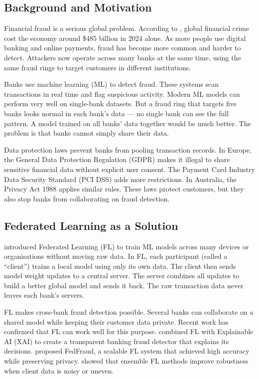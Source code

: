 \documentclass[12pt, a4paper]{article}
\begin{document}
\subsection{Background and Motivation}

Financial fraud is a serious global problem. According to \citet{nasdaq2024}, global financial crime cost the economy around \$485 billion in 2024 alone. As more people use digital banking and online payments, fraud has become more common and harder to detect. Attackers now operate across many banks at the same time, using the same fraud rings to target customers in different institutions.

Banks use machine learning (ML) to detect fraud. These systems scan transactions in real time and flag suspicious activity. Modern ML models can perform very well on single-bank datasets. But a fraud ring that targets five banks looks normal in each bank's data --- no single bank can see the full pattern. A model trained on all banks' data together would be much better. The problem is that banks cannot simply share their data.

Data protection laws prevent banks from pooling transaction records. In Europe, the General Data Protection Regulation (GDPR) makes it illegal to share sensitive financial data without explicit user consent. The Payment Card Industry Data Security Standard (PCI DSS) adds more restrictions. In Australia, the Privacy Act 1988 applies similar rules. These laws protect customers, but they also stop banks from collaborating on fraud detection.

\subsection{Federated Learning as a Solution}

\citet{mcmahan2017} introduced Federated Learning (FL) to train ML models across many devices or organisations without moving raw data. In FL, each participant (called a ``client'') trains a local model using only its own data. The client then sends model weight updates to a central server. The server combines all updates to build a better global model and sends it back. The raw transaction data never leaves each bank's servers.

FL makes cross-bank fraud detection possible. Several banks can collaborate on a shared model while keeping their customer data private. Recent work has confirmed that FL can work well for this purpose. \citet{khan2025} combined FL with Explainable AI (XAI) to create a transparent banking fraud detector that explains its decisions. \citet{alhasawi2025} proposed FedFraud, a scalable FL system that achieved high accuracy while preserving privacy. \citet{li2025fedmecs} showed that ensemble FL methods improve robustness when client data is noisy or uneven.
\end{document}
